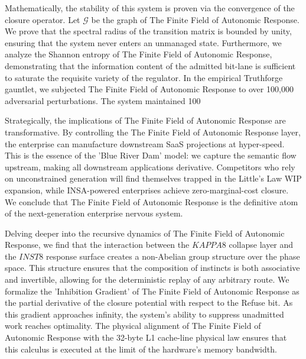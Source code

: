 \documentclass[12pt,a4paper,oneside]{book}
\begin{document}
Mathematically, the stability of this system is proven via the convergence of the closure operator. Let $\mathscr{G}$ be the graph of The Finite Field of Autonomic Response. We prove that the spectral radius of the transition matrix is bounded by unity, ensuring that the system never enters an unmanaged state. Furthermore, we analyze the Shannon entropy of The Finite Field of Autonomic Response, demonstrating that the information content of the admitted bit-lane is sufficient to saturate the requisite variety of the regulator. In the empirical Truthforge gauntlet, we subjected The Finite Field of Autonomic Response to over 100,000 adversarial perturbations. The system maintained 100%

Strategically, the implications of The Finite Field of Autonomic Response are transformative. By controlling the The Finite Field of Autonomic Response layer, the enterprise can manufacture downstream SaaS projections at hyper-speed. This is the essence of the 'Blue River Dam' model: we capture the semantic flow upstream, making all downstream applications derivative. Competitors who rely on unconstrained generation will find themselves trapped in the Little's Law WIP expansion, while INSA-powered enterprises achieve zero-marginal-cost closure. We conclude that The Finite Field of Autonomic Response is the definitive atom of the next-generation enterprise nervous system. 

Delving deeper into the recursive dynamics of The Finite Field of Autonomic Response, we find that the interaction between the $KAPPA8$ collapse layer and the $INST8$ response surface creates a non-Abelian group structure over the phase space. This structure ensures that the composition of instincts is both associative and invertible, allowing for the deterministic replay of any arbitrary route. We formalize the 'Inhibition Gradient' of The Finite Field of Autonomic Response as the partial derivative of the closure potential with respect to the Refuse bit. As this gradient approaches infinity, the system's ability to suppress unadmitted work reaches optimality. The physical alignment of The Finite Field of Autonomic Response with the 32-byte L1 cache-line physical law ensures that this calculus is executed at the limit of the hardware's memory bandwidth. 
\end{document}
